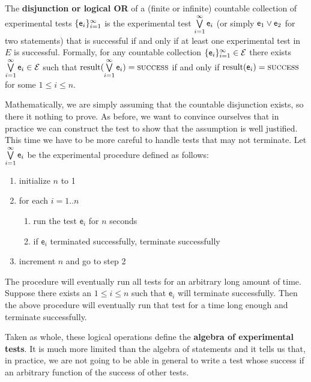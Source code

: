\documentclass[11pt,letterpaper,fleqn]{memoir} %
\begin{document}
\begin{mathSection}
	\begin{defn}\label{def_experimental_test_OR}
	The \textbf{disjunction or logical OR} of a (finite or infinite) countable collection of experimental tests $\{\mathsf{e}_i\}_{i=1}^{\infty}$ is the experimental test $\bigvee\limits_{i=1}^{\infty} \mathsf{e}_i$ (or simply $\mathsf{e}_1 \vee \mathsf{e}_2$ for two statements) that is successful if and only if at least one experimental test in $E$ is successful. Formally, for any countable collection $\{\mathsf{e}_i\}_{i=1}^{\infty} \in \mathcal{E}$ there exists $ \bigvee\limits_{i=1}^{\infty} \mathsf{e}_i \in \mathcal{E}$ such that $\operatorname{result}(\bigvee\limits_{i=1}^{\infty} \mathsf{e}_i) = \textsc{success}$ if and only if $\operatorname{result}(\mathsf{e}_i) = \textsc{success}$ for some $1 \leq i \leq n$.
	\end{defn}
	\begin{justification}
		Mathematically, we are simply assuming that the countable disjunction exists, so there it nothing to prove. As before, we want to convince ourselves that in practice we can construct the test to show that the assumption is well justified. This time we have to be more careful to handle tests that may not terminate.
		Let $\bigvee\limits_{i=1}^{\infty} \mathsf{e}_i$ be the experimental procedure defined as follows:
		\begin{enumerate}
			\item initialize $n$ to 1
			\item for each $i=1..n$
			\begin{enumerate}
				\item run the test $\mathsf{e}_i$ for $n$ seconds
				\item if $\mathsf{e}_i$ terminated successfully, terminate successfully
			\end{enumerate}
			\item increment $n$ and go to step 2
		\end{enumerate}
		The procedure will eventually run all tests for an arbitrary long amount of time. Suppose there exists an $1 \leq i \leq n$ such that $\mathsf{e}_i$ will terminate successfully. Then the above procedure will eventually run that test for a time long enough and terminate successfully.
	\end{justification}
\end{mathSection}

Taken as whole, these logical operations define the \textbf{algebra of experimental tests}. It is much more limited than the algebra of statements and it tells us that, in practice, we are not going to be able in general to write a test whose success if an arbitrary function of the success of other tests.
\end{document}
